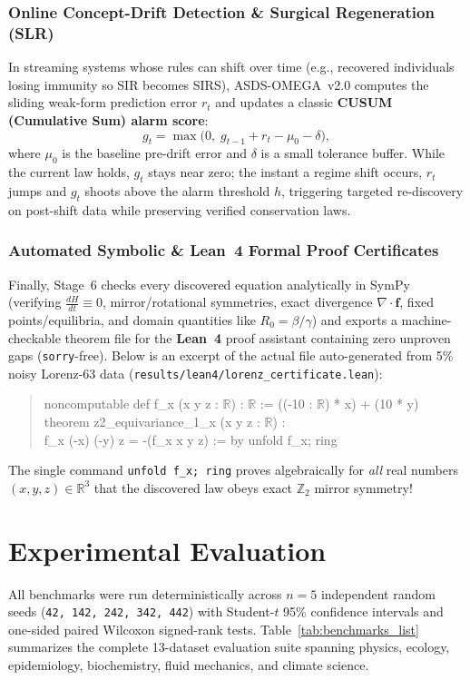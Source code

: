 \documentclass[11pt,a4paper]{article}
\begin{document}
\subsubsection{Online Concept-Drift Detection \& Surgical Regeneration (SLR)}
In streaming systems whose rules can shift over time (e.g., recovered individuals losing immunity so SIR becomes SIRS), ASDS-OMEGA~v2.0 computes the sliding weak-form prediction error $r_t$ and updates a classic \textbf{CUSUM (Cumulative Sum) alarm score}:
\begin{equation}
  g_t = \max\!\big(0,\; g_{t-1} + r_t - \mu_0 - \delta\big),
\end{equation}
where $\mu_0$ is the baseline pre-drift error and $\delta$ is a small tolerance buffer. While the current law holds, $g_t$ stays near zero; the instant a regime shift occurs, $r_t$ jumps and $g_t$ shoots above the alarm threshold $h$, triggering targeted re-discovery on post-shift data while preserving verified conservation laws.

\subsubsection{Automated Symbolic \& Lean~4 Formal Proof Certificates}
Finally, Stage~6 checks every discovered equation analytically in SymPy (verifying $\frac{dH}{dt} \equiv 0$, mirror/rotational symmetries, exact divergence $\nabla\cdot\mathbf{f}$, fixed points/equilibria, and domain quantities like $R_0 = \beta/\gamma$) and exports a machine-checkable theorem file for the \textbf{Lean~4} proof assistant containing zero unproven gaps (\texttt{sorry}-free). Below is an excerpt of the actual file auto-generated from 5\% noisy Lorenz-63 data (\texttt{results/lean4/lorenz\_certificate.lean}):
\begin{quote}\small\ttfamily
noncomputable def f\_x (x y z : $\mathbb{R}$) : $\mathbb{R}$ := ((-10 : $\mathbb{R}$) * x) + (10 * y)\\
theorem z2\_equivariance\_1\_x (x y z : $\mathbb{R}$) :\\
\hspace*{2em} f\_x (-x) (-y) z = -(f\_x x y z) := by unfold f\_x; ring
\end{quote}
The single command \texttt{unfold f\_x; ring} proves algebraically for \emph{all} real numbers $(x,y,z) \in \mathbb{R}^3$ that the discovered law obeys exact $\mathbb{Z}_2$ mirror symmetry!

\section{Experimental Evaluation}
All benchmarks were run deterministically across $n = 5$ independent random seeds (\texttt{42, 142, 242, 342, 442}) with Student-$t$ 95\% confidence intervals and one-sided paired Wilcoxon signed-rank tests. Table~\ref{tab:benchmarks_list} summarizes the complete 13-dataset evaluation suite spanning physics, ecology, epidemiology, biochemistry, fluid mechanics, and climate science.
\end{document}
